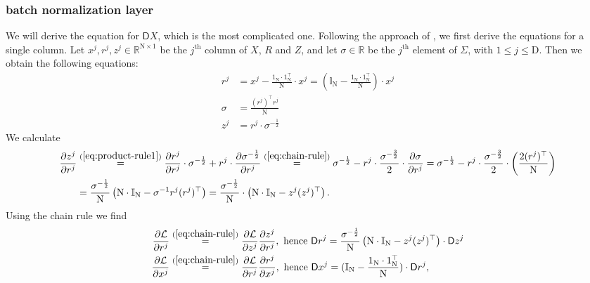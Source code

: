 \documentclass{article}
\newcommand{\const}[1]{\ensuremath{\mathrm{#1}}} %
\newcommand{\Gradient}{\textsf{D}}
\newcommand{\Derivative}[2]{\ensuremath{\frac{\partial #1}{\partial #2}}}
\newcommand{\Reals}{\mathbb{R}}
\begin{document}
\subsubsection*{batch normalization layer}
We will derive the equation for $\Gradient X$, which is the most complicated one.
Following the approach of \cite{yeh-batch-norm}, we first derive the equations for a single column. Let $x^j, r^j, z^j \in \Reals^{\const{N} \times 1}$ be the $j^\text{th}$ column of $X$, $R$ and $Z$, and let $\sigma \in \Reals$ be the $j^\text{th}$ element of $\Sigma$, with $1 \leq j \leq \const{D}$. Then we obtain the following equations:
\begin{align}
r^j &= x^j - \frac{1_\const{N} \cdot 1_\const{N}^\top}{\const{N}} \cdot x^j = (\mathbb{I}_{\const{N}} - \frac{1_\const{N} \cdot 1_\const{N}^\top}{\const{N}}) \cdot x^j
\\
\sigma &= \frac{(r^j)^\top r^j}{\const{N}} 
\\
z^j &= r^j \cdot \sigma^{-\frac{1}{2}}
\end{align}
We calculate
\begin{align}
  \Derivative{z^j}{r^j}
  & \overset{(\ref{eq:product-rule1})}{=}
  \Derivative{r^j}{r^j} \cdot \sigma^{-\frac{1}{2}}
  + r^j \cdot \Derivative{\sigma^{-\frac{1}{2}}}{r^j}
  \overset{(\ref{eq:chain-rule})}{=} 
  \sigma^{-\frac{1}{2}} - r^j \cdot 
  \frac{\sigma^{-\frac{3}{2}}}{2} \cdot \Derivative{\sigma}{r^j}
  =
  \sigma^{-\frac{1}{2}} - r^j \cdot 
  \frac{\sigma^{-\frac{3}{2}}}{2} \cdot \left( \frac{2 (r^j)^\top}{\const{N}} \right)
  \\
  &= 
  \frac{\sigma^{-\frac{1}{2}}}{\const{N}}
  \left(
    \const{N} \cdot \mathbb{I}_\const{N} - \sigma^{-1} r^j (r^j)^\top
  \right)
  =
  \frac{\sigma^{-\frac{1}{2}}}{\const{N}}
  \cdot 
  \left( 
    \const{N} \cdot \mathbb{I}_{\const{N}} - z^j (z^j)^\top  
  \right).
\end{align}
Using the chain rule we find
\begin{align}
  \frac{\partial \mathcal{L}}{\partial r^j} 
  & \overset{(\ref{eq:chain-rule})}{=}
  \frac{\partial \mathcal{L}}{\partial z^j}
  \frac{\partial z^j}{\partial r^j},
  \text{ hence }
  \Gradient{r^j} = 
  \frac{\sigma^{-\frac{1}{2}}}{\const{N}}
  \left( 
    \const{N} \cdot \mathbb{I}_{\const{N}} - z^j (z^j)^\top  
  \right)
  \cdot
  \Gradient{z^j}
  \\
  \frac{\partial \mathcal{L}}{\partial x^j} 
  & \overset{(\ref{eq:chain-rule})}{=}
  \frac{\partial \mathcal{L}}{\partial r^j}
  \frac{\partial r^j}{\partial x^j},
  \text{ hence }
  \Gradient x^j 
  = 
  (\mathbb{I}_{\const{N}} - \frac{1_\const{N} \cdot 1_\const{N}^\top}{\const{N}})
  \cdot
  \Gradient r^j,
\end{align}
\end{document}
